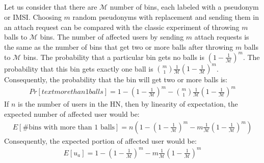 \documentclass{llncs} %
\begin{document}
\begin{subappendices}
\renewcommand{\thesection}{\Alph{section}}%

\section{} \label{appendix:A}
Let us consider that there are $\mathcal{M}$ number of bins, each labeled with a pseudonym or IMSI. Choosing $m$ random pseudonyms with replacement and sending them in an attach request can be compared with the classic experiment of throwing $m$ balls to $\mathcal{M}$ bins. The number of affected users by sending $m$ attach requests is the same as the number of bins that get two or more balls after throwing $m$ balls to $\mathcal{M}$ bins. The probability that a particular bin gets no balls is $\left(1-\frac{1}{\mathcal{M}}\right)^m$. The probability that this bin gets exactly one ball is $\binom{m}{1}\frac{1}{\mathcal{M}}\left(1-\frac{1}{\mathcal{M}}\right)^m$. Consequently, the probability that the bin will get two or more balls is:
\begin{eqnarray*}
 Pr[text{more than 1 balls}] = 1 - \left(1-\frac{1}{\mathcal{M}}\right)^m - \binom{m}{1}\frac{1}{\mathcal{M}}\left(1-\frac{1}{\mathcal{M}}\right)^m
\end{eqnarray*}
If $n$ is the number of users in the HN, then by linearity of expectation, the expected number of affected user would be:
\begin{eqnarray*}
E[\# \text{bins with more than 1 balls}] = n\left(1 - \left(1-\frac{1}{\mathcal{M}}\right)^m - m\frac{1}{\mathcal{M}}\left(1-\frac{1}{\mathcal{M}}\right)^m\right)
\end{eqnarray*}
Consequently, the expected portion of affected user would be:
\begin{eqnarray*}
 E[u_a] = 1 - \left(1-\frac{1}{\mathcal{M}}\right)^m - m\frac{1}{\mathcal{M}}\left(1-\frac{1}{\mathcal{M}}\right)^m
\end{eqnarray*}



\end{subappendices}
\end{document}
